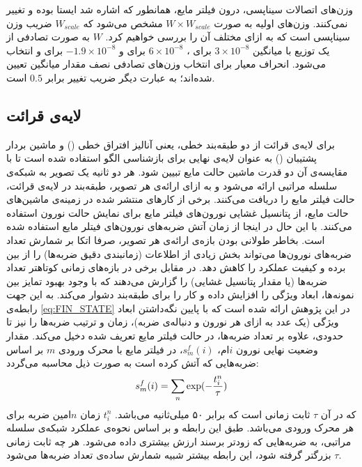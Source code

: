 وزن‌های اتصالات سیناپسی، درون فیلتر مایع، همانطور که اشاره شد ایستا بوده و تغییر نمی‌کنند. وزن‌های اولیه به صورت $W\times W_{scale}$ مشخص می‌شود که $W_{scale}$ ضریب وزن سیناپسی است که  به ازای مختلف آن را بررسی خواهیم کرد. $W$ به صورت تصادفی از یک توزیع با میانگین $3\times10^{-8}$ برای ، $6\times10^{-8}$ برای  و $-1.9\times 10^{-8}$ برای  و  انتخاب می‌شود\cite{maass2002real}. انحراف معیار برای انتخاب وزن‌های تصادفی نصف مقدار میانگین تعیین شده‌اند؛ به عبارت دیگر ضریب تغییر برابر $0.5$ است.

\subsection{لایه‌ی قرائت}
برای لایه‌ی قرائت از دو طبقه‌بند خطی، یعنی آنالیز افتراق خطی () و ماشین بردار پشتیبان () به عنوان لایه‌ی نهایی برای بازشناسی الگو استفاده شده است تا با مقایسه‌ی آن دو قدرت ماشین حالت مایع تبیین شود. هر دو ثانیه یک تصویر به شبکه‌ی سلسله مراتبی ارائه می‌شود و به ازای ارائه‌ی هر تصویر، طبقه‌بند در لایه‌ی قرائت، حالت فیلتر مایع را دریافت می‌کنند. برخی از کارهای منتشر شده در زمینه‌ی ماشین‌های حالت مایع، از پتانسیل غشایی نورون‌های فیلتر مایع برای نمایش حالت نورون استفاده می‌کنند. با این حال در اینجا از زمان آتش ضربه‌های نورون‌های فیتلر مایع استفاده شده است. بخاطر طولانی بودن بازه‌ی ارائه‌ی هر تصویر، صرفا اتکا بر شمارش تعداد ضربه‌های نورون‌ها می‌تواند بخش زیادی از اطلاعات (زمانبندی دقیق ضربه‌ها) را از بین برده  و کیفیت عملکرد را کاهش دهد. در مقابل برخی در بازه‌های زمانی کوتاهتر تعداد ضربه‌ها (یا مقدار پتانسیل غشایی) را گزارش می‌دهند که با وجود بهبود تمایز بین نمونه‌ها، ابعاد ویژگی را افزایش داده و کار را برای طبقه‌بند دشوار می‌کند. به این جهت رابطه‌ی \ref{eq:FIN_STATE} در این پژوهش ارائه شده است که با پایین نگه‌داشتن ابعاد ویژگی (یک عدد به ازای هر نورون و دنباله‌ی ضربه)، زمان و ترتیب ضربه‌ها را نیز تا حدودی، علاوه بر تعداد ضربه‌ها، در حالت فیلتر مایع تعریف شده دخیل می‌کند. 
مقدار وضعیت نهایی نورون $i$ام، $s^f_m(i)$، در فیلتر مایع با محرک ورودی $m$ بر اساس ضربه‌هایی که آتش کرده است به صورت ذیل محاسبه می‌گردد:
\begin{equation} \label{eq:FIN_STATE}
s^f_m(i) = \sum_{n}\textup{exp}(-\frac{t^n_i}{\tau})
\end{equation}
که در آن $\tau$ ثابت زمانی است که برابر ۵۰ میلی‌ثانیه می‌باشد. $t^n_i$ زمان $n$امین ضربه برای هر محرک ورودی می‌باشد. طبق این رابطه و بر اساس نحوه‌ی عملکرد شبکه‌ی سلسله مراتبی، به ضربه‌هایی که زودتر برسند ارزش بیشتری داده می‌شود. هر چه ثابت زمانی $\tau$ بزرگتر گرفته شود، این رابطه بیشتر شبیه شمارش ساده‌ی تعداد ضربه‌ها می‌شود.

